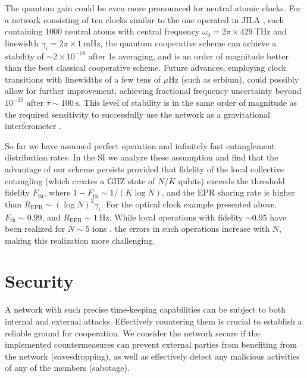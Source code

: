 The quantum gain could be even more pronounced for neutral atomic clocks. For a
network consisting of ten clocks similar to the one operated in JILA
\cite{Bloom2013}, each containing 1000 neutral atoms with central frequency
$\omega_0 = 2\pi\times 429~\mathrm{THz}$ and linewidth $\gamma_i = 2\pi \times
1~\mathrm{mHz}$,  the quantum cooperative scheme can achieve a stability of $\sim
2\times 10^{-18}$ after 1s averaging, and is an order of magnitude
better than the best classical cooperative scheme.  Future advances,
employing clock transitions with linewidths of a few tens of
$\mu\mathrm{Hz}$ (such as erbium), could possibly allow for further
improvement, achieving fractional frequency uncertainty beyond $10^{-20}$
after $\tau \sim 100~\mathrm{s}$. This level of stability is in the same order of
magnitude as the required sensitivity to successfully use the network as a
gravitational interferometer \cite{Schiller2008}.


So far we have assumed perfect operation and infinitely fast entanglement
distribution rates. In the SI we analyze these assumption and find that the
advantage of our scheme persists provided that fidelity  of the local collective
entangling \cite{MSgate} (which creates a GHZ state of $N/K$ qubits) exceeds the
threshold fidelity $F_\mathrm{th}$, where $1-F_\mathrm{th} \sim 1/(K\log N)$, and
the EPR sharing rate is higher than $R_\mathrm{EPR}\sim (\log N)^2 \gamma_i$.
For the optical clock example presented above, $F_\mathrm{th} \sim 0.99$, and
$R_\mathrm{EPR} \sim 1~\mathrm{Hz}$. While local operations with fidelity
$\sim 0.95$ have been realized for $N\sim 5$ ions \cite{Monz2011}, the errors
in such operations increase with $N$, making this realization more challenging.




\section{Security}
\label{sec:Security}
A network with such precise time-keeping capabilities can be subject to both internal
and external attacks. Effectively countering them is crucial to establish a
reliable ground for cooperation. We consider the network secure if the
implemented countermeasures can prevent external parties from benefiting from
the network (eavesdropping), as well as effectively detect any malicious activities of any of the members (sabotage).

